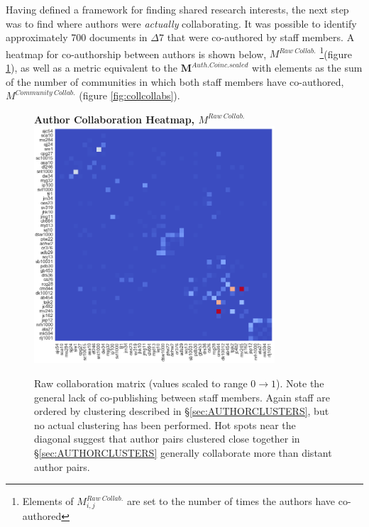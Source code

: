 Having defined a framework for finding shared research interests, the next step was to find where authors were \emph{actually} collaborating. It was possible to identify approximately 700 documents in $\Delta7$ that were co-authored by staff members. A heatmap for co-authorship between authors is shown below, $M^{Raw\ Collab.}$ \footnote{Elements of $M^{Raw\ Collab.}_{i , j}$ are set to the number of times the authors have co-authored}(figure \ref{fig:rawcollabs}), as well as a metric equivalent to the $\mathbf{M}^{Auth. Coinc.scaled}$ with elements as the sum of the number of communities in which both staff members have co-authored, $M^{Community\ Collab.}$ (figure \ref{fig:collcollabs}).
\begin{figure}[H]
  \centering
  \textbf{Author Collaboration Heatmap, $M^{Raw\ Collab.}$}
    \includegraphics[width=0.8\textwidth]{Analysis/raw_collabs.png}
    \caption[Author Collaboration Heatmap]{Raw collaboration matrix (values scaled to range $0 \rightarrow 1$). Note the general lack of co-publishing between staff members. Again staff are ordered by clustering described in \S\ref{sec:AUTHORCLUSTERS}, but no actual clustering has been performed. Hot spots near the diagonal suggest that author pairs clustered close together in \S\ref{sec:AUTHORCLUSTERS} generally collaborate more than distant author pairs.}
      \label{fig:rawcollabs}
  \end{figure}
